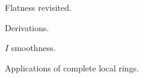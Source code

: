 Flatness  revisited.
\begin{enumx}
\item
\item
\item
\end{enumx}

Derivations. 
\begin{enumx}
\item
\item
\item
\end{enumx}

$I$  smoothness.
\begin{enumx}
\item
\item
\item
\end{enumx}

Applications  of complete local rings.
\begin{enumx}
\item
\item
\item
\end{enumx}


